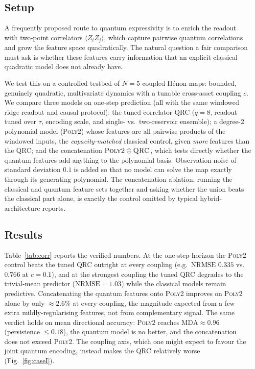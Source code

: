 \documentclass[11pt,a4paper]{article}
\newcommand{\nrmse}{\mathrm{NRMSE}}
\begin{document}
\subsection{Setup}

A frequently proposed route to quantum expressivity is to enrich the readout
with two-point correlators $\langle Z_i Z_j\rangle$, which capture pairwise
quantum correlations and grow the feature space quadratically. The natural
question a fair comparison must ask is whether these features carry information
that an explicit classical quadratic model does not already have.

We test this on a controlled testbed of $N=5$ coupled H\'enon maps: bounded,
genuinely quadratic, multivariate dynamics with a tunable cross-asset coupling
$c$. We compare three models on one-step prediction (all with the same windowed
ridge readout and causal protocol): the tuned correlator QRC ($q=8$, readout
tuned over $\tau$, encoding scale, and single- vs.\ two-reservoir ensemble); a
degree-2 polynomial model (\textsc{Poly2}) whose features are all pairwise
products of the windowed inputs, the \emph{capacity-matched} classical
control, given \emph{more} features than the QRC; and the
concatenation $\textsc{Poly2}\oplus\textsc{QRC}$, which tests directly whether
the quantum features add anything to the polynomial basis. Observation noise of
standard deviation $0.1$ is added so that no model can solve the map exactly
through its generating polynomial. The concatenation ablation, running the
classical and quantum feature sets together and asking whether the union beats
the classical part alone, is exactly the control omitted by typical
hybrid-architecture reports.

\subsection{Results}

Table~\ref{tab:corr} reports the verified numbers. At the one-step horizon the
\textsc{Poly2} control beats the tuned QRC outright at every coupling (e.g.\
$\nrmse$ $0.335$ vs.\ $0.766$ at $c=0.1$), and at the strongest coupling the
tuned QRC degrades to the trivial-mean predictor ($\nrmse=1.03$) while the
classical models remain predictive. Concatenating the quantum
features onto \textsc{Poly2} improves on \textsc{Poly2} alone by only
$\approx\!2.6\%$ at every coupling, the magnitude expected from a few extra mildly-regularising
features, not from complementary signal. The same verdict holds on mean
directional accuracy: \textsc{Poly2} reaches $\mathrm{MDA}\approx 0.96$
(persistence $\le 0.18$), the quantum model is no better, and the concatenation
does not exceed \textsc{Poly2}. The coupling axis, which one might expect to
favour the joint quantum encoding, instead makes the QRC relatively worse
(Fig.~\ref{fig:caseI}).
\end{document}
